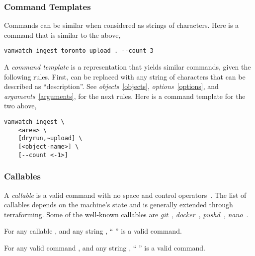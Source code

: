 \subsubsection{Command Templates}
\label{command-template}

Commands can be similar when considered as strings of characters. Here is a command that is similar to the above,
%
\begin{verbatim}
vanwatch ingest toronto upload . --count 3
\end{verbatim}
%
A \emph{command template} is a representation that yields similar commands, given the following rules. First,  can be replaced with any string of characters that can be described as ``description''. See \emph{objects}~\ref{objects}, \emph{options}~\ref{options}, and \emph{arguments}~\ref{arguments}, for the next rules. Here is a command template for the two above,
%
\begin{verbatim}
vanwatch ingest \
    <area> \
    [dryrun,~upload] \
    [<object-name>] \
    [--count <-1>]
\end{verbatim}

\subsubsection{Callables}
\label{callables}

A \emph{callable} is a valid command with no space and control operators~. The list of callables depends on the machine's state and is generally extended through terraforming. Some of the well-known callables are \emph{git}~, \emph{docker}~, \emph{pushd}~, \emph{nano}~. 

\begin{theorem}
For any callable , and any string , `` '' is a valid command.
\end{theorem}

\begin{theorem}
For any valid command \placeholder{command}, and any string \placeholder{suffix}, ``\placeholder{command} \placeholder{suffix}'' is a valid command.
\end{theorem}


